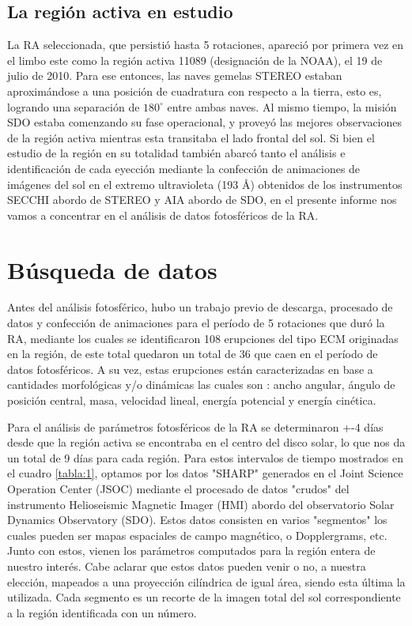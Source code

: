 \documentclass[12pt,a4paper,spanish]{article}
\begin{document}
\newpage

\subsection{La región activa en estudio}
La RA seleccionada, que persistió hasta 5 rotaciones, apareció por primera vez en el limbo este como la región activa 11089 (designación de la NOAA), el 19 de julio de 2010. Para ese entonces, las naves gemelas STEREO estaban aproximándose a una posición de cuadratura con respecto a la tierra, esto es, logrando una separación de $180^{\circ}$ entre ambas naves. Al mismo tiempo, la misión SDO estaba comenzando su fase operacional, y proveyó las mejores observaciones de la región activa mientras esta transitaba el lado frontal del sol. Si bien el estudio de la región en su totalidad también abarcó tanto el análisis e identificación de cada eyección mediante la confección de animaciones de imágenes del  sol en el extremo ultravioleta (193 \AA) obtenidos de los instrumentos SECCHI abordo de STEREO y AIA abordo de SDO, en el presente informe nos vamos a concentrar en el análisis de datos fotosféricos de la RA.

\section{Búsqueda de datos}
Antes del análisis fotosférico, hubo un trabajo previo de descarga, procesado de datos y confección de animaciones para el período de 5 rotaciones que duró la RA, mediante los cuales se identificaron 108 erupciones del tipo ECM originadas en la región, de este total quedaron un total de 36 que caen en el período de datos fotosféricos. A su vez, estas erupciones están caracterizadas en base a cantidades morfológicas y/o dinámicas las cuales son : ancho angular, ángulo de posición central, masa, velocidad lineal, energía potencial y energía cinética.\par 
Para el análisis de parámetros fotosféricos de la RA se determinaron +-4 días desde que la región activa se encontraba en el centro del disco solar, lo que nos da un total de 9 días para cada región. Para estos intervalos de tiempo mostrados en el cuadro \ref{tabla:1}, optamos por los datos "SHARP" generados en el Joint Science Operation Center (JSOC) mediante el procesado de datos "crudos" del instrumento Helioseismic Magnetic Imager (HMI) abordo del observatorio Solar Dynamics Observatory (SDO). Estos datos consisten en varios "segmentos" los cuales pueden ser mapas espaciales de campo magnético, o Dopplergrams, etc. Junto con estos, vienen los parámetros computados para la región entera de nuestro interés. Cabe aclarar que estos datos pueden venir o no, a nuestra elección, mapeados a una proyección cilíndrica de igual área, siendo esta última la utilizada. Cada segmento es un recorte de la imagen total del sol correspondiente a la región identificada con un número.\par
\end{document}
